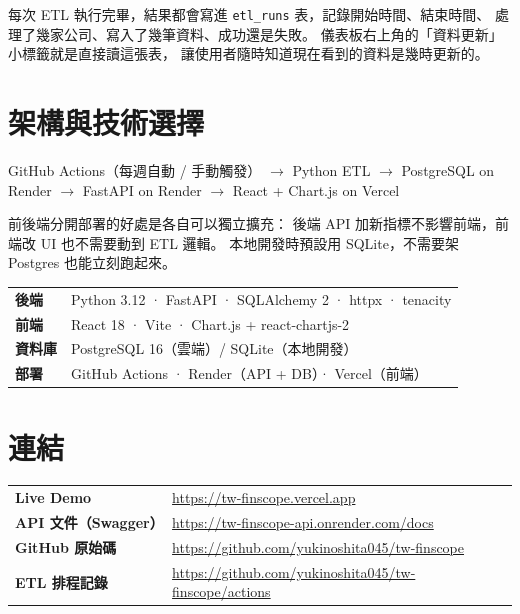 \documentclass[11pt, a4paper]{article}
\newcommand{\demourl}{https://tw-finscope.vercel.app}
\newcommand{\githuburl}{https://github.com/yukinoshita045/tw-finscope}
\begin{document}
每次 ETL 執行完畢，結果都會寫進 \texttt{etl\_runs} 表，記錄開始時間、結束時間、
處理了幾家公司、寫入了幾筆資料、成功還是失敗。
儀表板右上角的「資料更新」小標籤就是直接讀這張表，
讓使用者隨時知道現在看到的資料是幾時更新的。

\section{架構與技術選擇}

\begin{center}
\small\color{darkgray}
GitHub Actions（每週自動 / 手動觸發）
$\rightarrow$ Python ETL
$\rightarrow$ PostgreSQL on Render
$\rightarrow$ FastAPI on Render
$\rightarrow$ React + Chart.js on Vercel
\end{center}

\vspace{2pt}
前後端分開部署的好處是各自可以獨立擴充：
後端 API 加新指標不影響前端，前端改 UI 也不需要動到 ETL 邏輯。
本地開發時預設用 SQLite，不需要架 Postgres 也能立刻跑起來。

\begin{tabular}{@{}ll@{}}
\textbf{後端} & Python 3.12 · FastAPI · SQLAlchemy 2 · httpx · tenacity \\
\textbf{前端} & React 18 · Vite · Chart.js + react-chartjs-2 \\
\textbf{資料庫} & PostgreSQL 16（雲端）/ SQLite（本地開發）\\
\textbf{部署} & GitHub Actions · Render（API + DB）· Vercel（前端）\\
\end{tabular}

\section{連結}

\begin{tabular}{@{}ll@{}}
\textbf{Live Demo} &
  \href{\demourl}{\textcolor{urlcolor}{\demourl}} \\[4pt]
\textbf{API 文件（Swagger）} &
  \href{https://tw-finscope-api.onrender.com/docs}{\textcolor{urlcolor}{https://tw-finscope-api.onrender.com/docs}} \\[4pt]
\textbf{GitHub 原始碼} &
  \href{\githuburl}{\textcolor{urlcolor}{\githuburl}} \\[4pt]
\textbf{ETL 排程記錄} &
  \href{\githuburl/actions}{\textcolor{urlcolor}{\githuburl/actions}} \\
\end{tabular}
\end{document}
